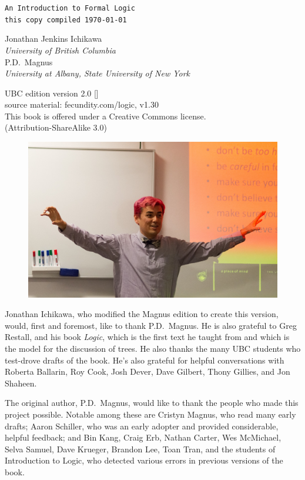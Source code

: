 \thispagestyle{empty}
{\Huge\forallx}

{\tt An Introduction to Formal Logic\\
this copy compiled \today}
\vfill



{\sf Jonathan Jenkins Ichikawa}\\
\emph{University of British Columbia}
\\
{\sf P.D.\ Magnus}\\
\emph{University at Albany, State University of New York}\\




\vfill




{\sf
	UBC edition version 2.0 [\bookversion]\\
	source material: fecundity.com/logic, v1.30\\
	This book is offered under a Creative Commons license.\\
	(Attribution-ShareAlike 3.0)
}



\newpage
\thispagestyle{empty}%

\begin{figure}[h!]
  \includegraphics[width=\linewidth]{images/ichikawa.jpg}
  \centering
\end{figure}

{\sf
Jonathan Ichikawa, who modified the Magnus edition to create this version, would, first and foremost, like to thank P.D.\ Magnus. He is also grateful to Greg Restall, and his book \emph{Logic}, which is the first text he taught from and which is the model for the discussion of trees. He also thanks the many UBC students who test-drove drafts of the book. He's also grateful for helpful conversations with Roberta Ballarin, Roy Cook, Josh Dever, Dave Gilbert, Thony Gillies, and Jon Shaheen.

The original author, P.D.\ Magnus, would like to thank the people who made this project possible. Notable among these are Cristyn Magnus, who read many early drafts; Aaron Schiller, who was an early adopter and provided considerable, helpful feedback; {and} Bin Kang, Craig Erb, Nathan Carter, Wes McMichael, Selva Samuel, Dave Krueger, Brandon Lee, Toan Tran, and the students of Introduction to Logic, who detected various errors in previous versions of the book.
}

